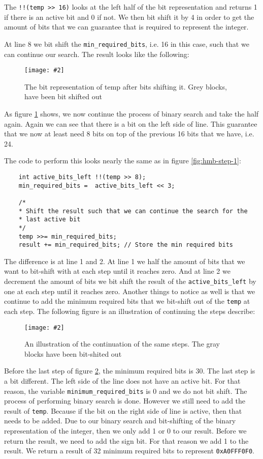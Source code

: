 \documentclass[11pt]{article}
\newcommand{\code}[1]{{\colorbox{lightgray!15}{\color{black}\texttt{#1}}}}
\newcommand{\centeredpic}[4][0.5]{
    \begin{figure}[h]
        \texttt{[image: \#2]}
        \centering
        \caption{#3}
        \label{fig:#4}
    \end{figure}
}
\begin{document}
The \code{!!(temp >> 16)} looks at the left half of the bit representation and returns 1 if there is an active bit and 0 if not. We then bit shift it by 4 in order to get the amount of bits 
that we can guarantee that is required to represent the integer. 

At line 8 we bit shift the \code{min\_required\_bits}, i.e. 16 in this case, such that we can continue our search. The result looks like the following:
\centeredpic{howmanybits-02.png}{The bit representation of temp after bits shifting it. Grey blocks, have been bit shifted out}{hmb-step-2}

As figure \ref{fig:hmb-step-2} shows, we now continue the process of binary search and take the half again. Again we can see that there is
a bit on the left side of line. This guarantee that we now at least need 8 bits on top of the previous 16 bits that we have, i.e. 24.

The code to perform this looks nearly the same as in figure \ref{fig:hmb-step-1}:
\begin{lstlisting}
    int active_bits_left !!(temp >> 8);
    min_required_bits =  active_bits_left << 3;

    /* 
    * Shift the result such that we can continue the search for the 
    * last active bit 
    */
    temp >>= min_required_bits;
    result += min_required_bits; // Store the min required bits
\end{lstlisting}

The difference is at line 1 and 2. At line 1 we half the amount of bits that we want to bit-shift with at each step until it reaches zero. And at line 2 we decrement the 
amount of bits we bit shift the result of the \code{active\_bits\_left} by one at each step until it reaches zero. 
Another things to notice as well is that we continue to add the minimum required bits that we bit-shift out of the \code{temp} at each step.
The following figure is an illustration of continuing the steps describe: 
\centeredpic{howmanybits-03.png}{An illustration of the continuation of the same steps. The gray blocks have been bit-shited out}{hmb-step-last}

Before the last step of figure \ref{fig:hmb-step-last}, the minimum required bits is 30. The last step is a bit different. The left side of the line does not have an active bit.
For that reason, the variable \code{minimum\_required\_bits} is 0 and we do not bit shift.
The process of performing binary search is done. However we still need to add the result of \code{temp}. Because if the bit on the right side of line is active, then that needs to be added.
Due to our binary search and bit-shifting of the binary representation of the integer, then we only add 1 or 0 to our result. 
Before we return the result, we need to add the sign bit. For that reason we add 1 to the result. We return a result of 32 minimum required bits to represent \code{0xA0FFF0F0}.
\end{document}
